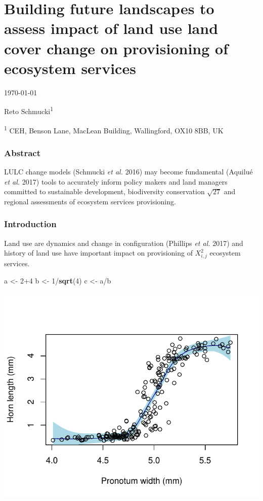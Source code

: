 \documentclass[]{article}
\title{}
\author{}
\date{}
\newenvironment{Shaded}{\begin{snugshade}}{\end{snugshade}}
\newcommand{\KeywordTok}[1]{\textcolor[rgb]{0.13,0.29,0.53}{\textbf{{#1}}}}
\newcommand{\DecValTok}[1]{\textcolor[rgb]{0.00,0.00,0.81}{{#1}}}
\newcommand{\StringTok}[1]{\textcolor[rgb]{0.31,0.60,0.02}{{#1}}}
\newcommand{\NormalTok}[1]{{#1}}
\begin{document}
\section{Building future landscapes to assess impact of land use land
cover change on provisioning of ecosystem
services}\label{building-future-landscapes-to-assess-impact-of-land-use-land-cover-change-on-provisioning-of-ecosystem-services}

\today  

Reto Schmucki\textsuperscript{1}

\textsuperscript{1} CEH, Benson Lane, MacLean Building, Wallingford,
OX10 8BB, UK

\subsubsection{Abstract}\label{abstract}

LULC change models (Schmucki \emph{et al.} 2016) may become fundamental
(Aquilué \emph{et al.} 2017) tools to accurately inform policy makers
and land managers committed to sustainable development, biodiversity
conservation \(\sqrt{27}\) and regional assessments of ecosystem
services provisioning.

\subsubsection{Introduction}\label{introduction}

Land use are dynamics and change in configuration (Phillips \emph{et
al.} 2017) and history of land use have important impact on provisioning
of \(X^2_{i,j}\) ecosystem services.

\begin{Shaded}
\begin{Highlighting}[]
\NormalTok{a <-}\StringTok{ }\DecValTok{2+4}
\NormalTok{b <-}\StringTok{ }\DecValTok{1}\NormalTok{/}\KeywordTok{sqrt}\NormalTok{(}\DecValTok{4}\NormalTok{)}
\NormalTok{c <-}\StringTok{ }\NormalTok{a/b}
\end{Highlighting}
\end{Shaded}

\includegraphics{landUseChangePaper_files/figure-latex/chunk_name-1.pdf}
\end{document}
